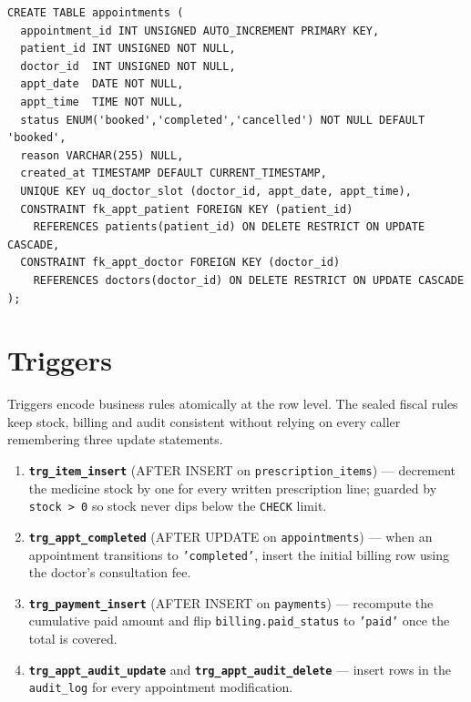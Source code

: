 \documentclass[11pt]{article}
\begin{document}
\begin{lstlisting}
CREATE TABLE appointments (
  appointment_id INT UNSIGNED AUTO_INCREMENT PRIMARY KEY,
  patient_id INT UNSIGNED NOT NULL,
  doctor_id  INT UNSIGNED NOT NULL,
  appt_date  DATE NOT NULL,
  appt_time  TIME NOT NULL,
  status ENUM('booked','completed','cancelled') NOT NULL DEFAULT 'booked',
  reason VARCHAR(255) NULL,
  created_at TIMESTAMP DEFAULT CURRENT_TIMESTAMP,
  UNIQUE KEY uq_doctor_slot (doctor_id, appt_date, appt_time),
  CONSTRAINT fk_appt_patient FOREIGN KEY (patient_id)
    REFERENCES patients(patient_id) ON DELETE RESTRICT ON UPDATE CASCADE,
  CONSTRAINT fk_appt_doctor FOREIGN KEY (doctor_id)
    REFERENCES doctors(doctor_id) ON DELETE RESTRICT ON UPDATE CASCADE
);
\end{lstlisting}

\section{Triggers}
Triggers encode business rules atomically at the row level.
The sealed fiscal rules keep stock, billing and audit consistent without
relying on every caller remembering three update statements.

\begin{enumerate}
  \item \textbf{\texttt{trg\_item\_insert}} (AFTER INSERT on
        \texttt{prescription\_items}) --- decrement the medicine stock by one
        for every written prescription line; guarded by \texttt{stock > 0}
        so stock never dips below the \texttt{CHECK} limit.
  \item \textbf{\texttt{trg\_appt\_completed}} (AFTER UPDATE on
        \texttt{appointments}) --- when an appointment transitions to
        \texttt{'completed'}, insert the initial billing row using the
        doctor's consultation fee.
  \item \textbf{\texttt{trg\_payment\_insert}} (AFTER INSERT on
        \texttt{payments}) --- recompute the cumulative paid amount and
        flip \texttt{billing.paid\_status} to \texttt{'paid'} once the
        total is covered.
  \item \textbf{\texttt{trg\_appt\_audit\_update}} and
        \textbf{\texttt{trg\_appt\_audit\_delete}} --- insert rows in the
        \texttt{audit\_log} for every appointment modification.
\end{enumerate}
\end{document}
